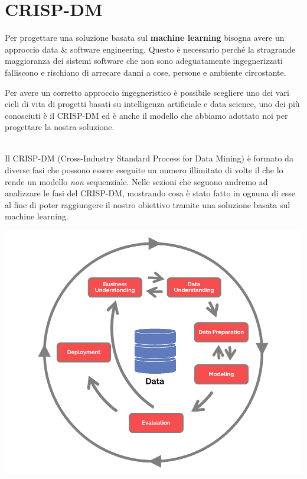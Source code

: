 \documentclass[a4paper, 11pt, oneside]{report}
\begin{document}
            \section{CRISP-DM}
            Per progettare una soluzione basata sul \textbf{machine learning} bisogna avere un approccio data \& software
            engineering.
            Questo è necessario perché la stragrande maggioranza dei sistemi software che non sono adeguatamente ingegnerizzati
            falliscono e rischiano di arrecare danni a cose, persone e ambiente circostante.
            \par \noindent Per avere un corretto approccio ingegneristico è possibile scegliere uno dei vari cicli di vita
            di progetti basati su intelligenza artificiale e data science, uno dei più conosciuti è il CRISP-DM ed è anche
            il modello che abbiamo adottato noi per progettare la nostra soluzione.
            \par \noindent
            \\ \noindent Il CRISP-DM (Cross-Industry Standard Process for Data Mining) è formato da diverse fasi che possono
            essere eseguite un numero illimitato di volte il che lo rende un modello \textit{non} sequenziale.
            Nelle sezioni che seguono andremo ad analizzare le fasi del CRISP-DM, mostrando cosa è stato fatto in ognuna di esse
            al fine di poter raggiungere il nostro obiettivo tramite una soluzione basata sul machine learning.
            \par \noindent
            \begin{center}
                \includegraphics[scale=0.3]{CRISP-DM}
            \end{center}
\end{document}
